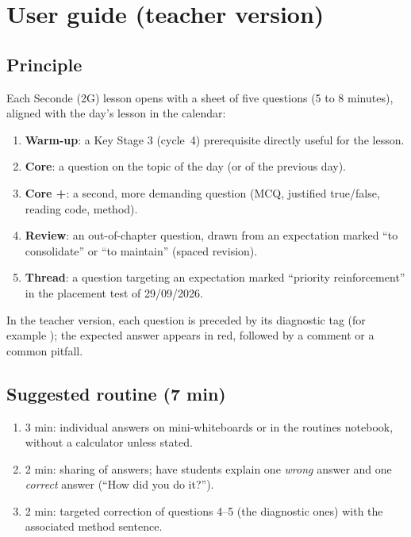 \section{User guide (teacher version)}
\subsection*{Principle}
Each Seconde (2G) lesson opens with a sheet of five questions (5 to 8 minutes), aligned with the day's lesson in the calendar:
\begin{enumerate}[label=\textbf{\arabic*.},leftmargin=1.6em]
  \item \textbf{Warm-up}: a Key Stage 3 (cycle~4) prerequisite directly useful for the lesson.
  \item \textbf{Core}: a question on the topic of the day (or of the previous day).
  \item \textbf{Core +}: a second, more demanding question (MCQ, justified true/false, reading code, method).
  \item \textbf{Review}: an out-of-chapter question, drawn from an expectation marked ``to consolidate'' or ``to maintain'' (spaced revision).
  \item \textbf{Thread}: a question targeting an expectation marked ``priority reinforcement'' in the placement test of 29/09/2026.
\end{enumerate}
In the teacher version, each question is preceded by its diagnostic tag (for example ); the expected answer appears in red, followed by a comment or a common pitfall.

\subsection*{Suggested routine (7 min)}
\begin{enumerate}[label=\textbf{\arabic*.},leftmargin=1.6em]
  \item 3 min: individual answers on mini-whiteboards or in the routines notebook, without a calculator unless stated.
  \item 2 min: sharing of answers; have students explain one \emph{wrong} answer and one \emph{correct} answer (``How did you do it?'').
  \item 2 min: targeted correction of questions 4--5 (the diagnostic ones) with the associated method sentence.
\end{enumerate}


